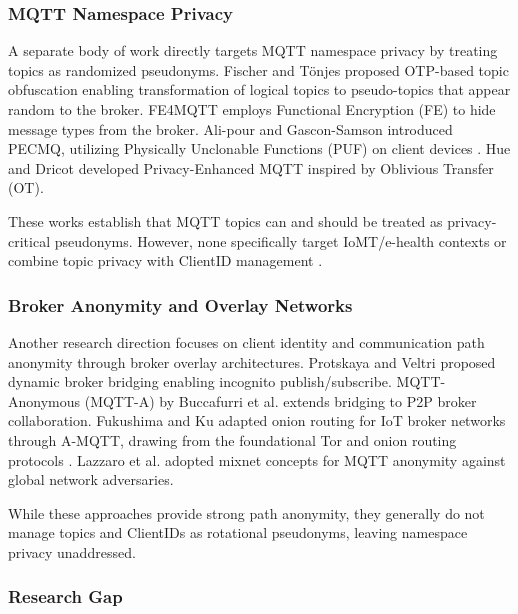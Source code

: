 \documentclass[conference]{IEEEtran}
\begin{document}
\subsubsection{MQTT Namespace Privacy}

A separate body of work directly targets MQTT namespace privacy by treating topics as randomized pseudonyms. Fischer and T\"{o}njes \cite{fischer_topic_privacy, fischer_fe4mqtt_2025} proposed OTP-based topic obfuscation enabling transformation of logical topics to pseudo-topics that appear random to the broker. FE4MQTT \cite{fe4mqtt} employs Functional Encryption (FE) to hide message types from the broker. Ali-pour and Gascon-Samson \cite{pecmq} introduced PECMQ, utilizing Physically Unclonable Functions (PUF) on client devices \cite{puf_key_exchange}. Hue and Dricot \cite{privacy_enhanced_mqtt} developed Privacy-Enhanced MQTT inspired by Oblivious Transfer (OT).

These works establish that MQTT topics can and should be treated as privacy-critical pseudonyms. However, none specifically target IoMT/e-health contexts or combine topic privacy with ClientID management \cite{abe_mqtt_chaos, iot_attribute_security, hierarchical_ibe_mqtt}.

\subsubsection{Broker Anonymity and Overlay Networks}

Another research direction focuses on client identity and communication path anonymity through broker overlay architectures. Protskaya and Veltri \cite{dynamic_bridging} proposed dynamic broker bridging enabling incognito publish/subscribe. MQTT-Anonymous (MQTT-A) by Buccafurri et al. \cite{mqtt_anonymous} extends bridging to P2P broker collaboration. Fukushima and Ku \cite{a_mqtt} adapted onion routing for IoT broker networks through A-MQTT, drawing from the foundational Tor and onion routing protocols \cite{tor_onion, onion_routing}. Lazzaro et al. \cite{mixnet_mqtt} adopted mixnet concepts for MQTT anonymity against global network adversaries.

While these approaches provide strong path anonymity, they generally do not manage topics and ClientIDs as rotational pseudonyms, leaving namespace privacy unaddressed.

\subsubsection{Research Gap}
\end{document}
